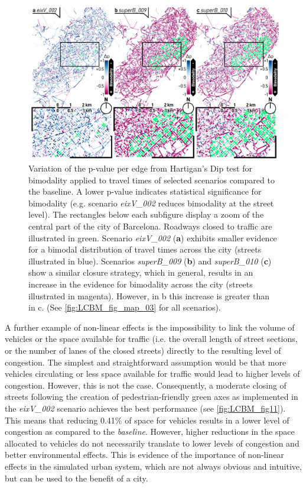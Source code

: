 \begin{figure}[htbp!]
    \centering
    \includegraphics[width=1\textwidth]{LCBM_fig10.jpg}
    \caption{Variation of the p-value per edge from Hartigan's Dip test for bimodality applied to travel times of selected scenarios compared to the baseline. A lower p-value indicates statistical significance for bimodality (e.g. scenario \emph{eixV\_002} reduces bimodality at the street level). The rectangles below each subfigure display a zoom of the central part of the city of Barcelona. Roadways closed to traffic are illustrated in green. Scenario \emph{eixV\_002} (\textbf{a}) exhibits smaller evidence for a bimodal distribution of travel times across the city (streets illustrated in blue). Scenarios \emph{superB\_009} (\textbf{b}) and \emph{superB\_010} (\textbf{c}) show a similar closure strategy, which in general, results in an increase in the evidence for bimodality across the city (streets illustrated in magenta). However, in b this increase is greater than in c. (See \cref{fig:LCBM_fig_map_03} for all scenarios).}
   \label{fig:LCBM_fig10}
\end{figure}

A further example of non-linear effects is the impossibility to link the volume of vehicles or the space available for traffic (i.e. the overall length of street sections, or the number of lanes of the closed streets) directly to the resulting level of congestion. The simplest and straightforward assumption would be that more vehicles circulating or less space available for traffic would lead to higher levels of congestion. However, this is not the case. Consequently, a moderate closing of streets following the creation of pedestrian-friendly green axes as implemented in the \emph{eixV\_002} scenario achieves the best performance (see \cref{fig:LCBM_fig11}). This means that reducing 0.41\%  of space for vehicles results in a lower level of congestion as compared to the \emph{baseline}. However, higher reductions in the space allocated to vehicles do not necessarily translate to lower levels of congestion and better environmental effects. This is evidence of the importance of non-linear effects in the simulated urban system, which are not always obvious and intuitive, but can be used to the benefit of a city.

